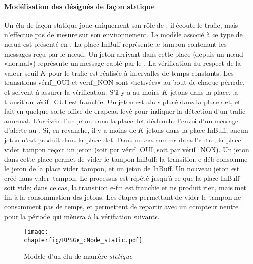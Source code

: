             \paragraph{Modélisation des \cns désignés de façon statique}
Un \cn élu de façon statique joue uniquement son rôle de \cn: il écoute le trafic, mais n'effectue pas de mesure sur son environnement.
Le modèle \rpsge associé à ce type de nœud est présenté en .
La place \textsf{InBuff} représente le tampon contenant les messages reçu par le nœud.
Un jeton arrivant dans cette place (depuis un nœud «normal») représente un message capté par le \cn.
La vérification du respect de la valeur seuil $K$ pour le trafic est réalisée à intervalles de temps constants.
Les transitions \textsf{vérif\_OUI} et \textsf{vérif\_NON} sont «activées» au bout de chaque période, et servent à assurer la vérification.
S'il y a au moins $K$ jetons dans la place, la transition \textsf{vérif\_OUI} est franchie.
Un jeton est alors placé dans la place \textsf{det}, et fait en quelque sorte office de drapeau levé pour indiquer la détection d'un trafic anormal.
L'arrivée d'un jeton dans la place \textsf{det} déclenche l'envoi d'un message d'alerte au \ch.
Si, en revanche, il y a moins de $K$ jetons dans la place \textsf{InBuff}, aucun jeton n'est produit dans la place \textsf{det}.
Dans un cas comme dans l'autre, la place \textsf{vider~tampon} reçoit un jeton (soit par \textsf{vérif\_OUI}, soit par \textsf{vérif\_NON}).
Un jeton dans cette place permet de vider le tampon \textsf{InBuff}: la transition \textsf{e-déb} consomme le jeton de la place \textsf{vider~tampon}, et un jeton de \textsf{InBuff}.
Un nouveau jeton est créé dans \textsf{vider~tampon}.
Le processus est répété jusqu'à ce que la place \textsf{InBuff} soit vide; dans ce cas, la transition \textsf{e-fin} est franchie et ne produit rien, mais met fin à la consommation des jetons.
Les étapes permettant de vider le tampon ne consomment pas de temps, et permettent de repartir avec un compteur neutre pour la période qui mènera à la vérifiation suivante.
\begin{figure}[ht]
    \centering
    \texttt{[image: \\chapterfig/RPSGe\_cNode\_static.pdf]}
    \caption{Modèle \rpsge d'un \cn élu de manière \emph{statique}}\label{sa:fig:cnodegspn1}
\end{figure}

